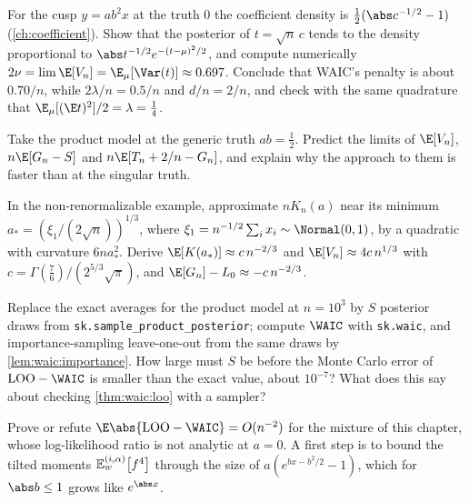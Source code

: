 \begin{refsection}
\begin{exercises}
\item\label{ex:waic:cusp}\byhand For the cusp $y=ab^2x$ at the truth $0$ the coefficient density is $\tfrac12(\abs c^{-1/2}-1)$ (\cref{ch:coefficient}). Show that the posterior of $t=\sqrt n\,c$ tends to the density proportional to $\abs t^{-1/2}e^{-(t-\mu)^2/2}$, and compute numerically $2\nu=\lim\E[V_n]=\E_\mu[\Var(t)]\approx0.697$. Conclude that WAIC's penalty is about $0.70/n$, while $2\lambda/n=0.5/n$ and $d/n=2/n$, and check with the same quadrature that $\E_\mu[(\E t)^2]/2=\lambda=\tfrac14$.
\item\variation Take the product model at the generic truth $ab=\tfrac12$. Predict the limits of $\E[V_n]$, $n\E[G_n-S]$ and $n\E[T_n+2/n-G_n]$, and explain why the approach to them is faster than at the singular truth.
\item\label{ex:waic:nonrenorm}\variation\hard In the non-renormalizable example, approximate $nK_n(a)$ near its minimum $a_*=(\xi_1/(2\sqrt n))^{1/3}$, where $\xi_1=n^{-1/2}\sum_ix_i\sim\Normal(0,1)$, by a quadratic with curvature $6na_*^2$. Derive $\E[K(a_*)]\approx c\,n^{-2/3}$ and $\E[V_n]\approx4c\,n^{1/3}$ with $c=\Gamma(\tfrac76)/(2^{5/3}\sqrt\pi)$, and $\E[G_n]-L_0\approx-c\,n^{-2/3}$. 
\item\measurement Replace the exact averages for the product model at $n=10^3$ by $S$ posterior draws from \texttt{sk.sample\_product\_posterior}; compute $\WAIC$ with \texttt{sk.waic}, and importance-sampling leave-one-out from the same draws by \cref{lem:waic:importance}. How large must $S$ be before the Monte Carlo error of $\waicLOO-\WAIC$ is smaller than the exact value, about $10^{-7}$? What does this say about checking \cref{thm:waic:loo} with a sampler?
\item\research Prove or refute $\E\abs{\waicLOO-\WAIC}=O(n^{-2})$ for the mixture of this chapter, whose log-likelihood ratio is not analytic at $a=0$. A first step is to bound the tilted moments $\mathbb{E}^{(i,\alpha)}_{w}\!\left[f^4\right]$ through the size of $a(e^{bx-b^2/2}-1)$, which for $\abs b\le1$ grows like $e^{\abs x}$.
\end{exercises}

\notesandrefs


\end{refsection}
